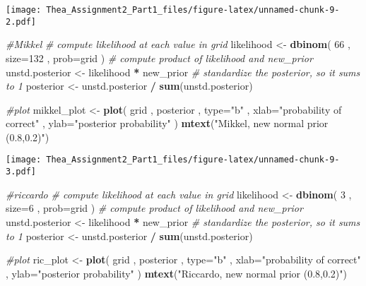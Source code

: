 \documentclass[]{article}
\newenvironment{Shaded}{\begin{snugshade}}{\end{snugshade}}
\newcommand{\KeywordTok}[1]{\textcolor[rgb]{0.13,0.29,0.53}{\textbf{#1}}}
\newcommand{\DataTypeTok}[1]{\textcolor[rgb]{0.13,0.29,0.53}{#1}}
\newcommand{\DecValTok}[1]{\textcolor[rgb]{0.00,0.00,0.81}{#1}}
\newcommand{\StringTok}[1]{\textcolor[rgb]{0.31,0.60,0.02}{#1}}
\newcommand{\CommentTok}[1]{\textcolor[rgb]{0.56,0.35,0.01}{\textit{#1}}}
\newcommand{\OperatorTok}[1]{\textcolor[rgb]{0.81,0.36,0.00}{\textbf{#1}}}
\newcommand{\NormalTok}[1]{#1}
\begin{document}
\texttt{[image: Thea\_Assignment2\_Part1\_files/figure-latex/unnamed-chunk-9-2.pdf]}

\begin{Shaded}
\begin{Highlighting}[]
\CommentTok{#Mikkel}
\CommentTok{# compute likelihood at each value in grid}
\NormalTok{likelihood <-}\StringTok{ }\KeywordTok{dbinom}\NormalTok{( }\DecValTok{66}\NormalTok{ , }\DataTypeTok{size=}\DecValTok{132}\NormalTok{ , }\DataTypeTok{prob=}\NormalTok{grid )}
\CommentTok{# compute product of likelihood and new_prior}
\NormalTok{unstd.posterior <-}\StringTok{ }\NormalTok{likelihood }\OperatorTok{*}\StringTok{ }\NormalTok{new_prior}
\CommentTok{# standardize the posterior, so it sums to 1}
\NormalTok{posterior <-}\StringTok{ }\NormalTok{unstd.posterior }\OperatorTok{/}\StringTok{ }\KeywordTok{sum}\NormalTok{(unstd.posterior)}

\CommentTok{#plot}
\NormalTok{mikkel_plot <-}\StringTok{ }\KeywordTok{plot}\NormalTok{( grid , posterior , }\DataTypeTok{type=}\StringTok{"b"}\NormalTok{ ,}
    \DataTypeTok{xlab=}\StringTok{"probability of correct"}\NormalTok{ , }\DataTypeTok{ylab=}\StringTok{"posterior probability"}\NormalTok{ )}
\KeywordTok{mtext}\NormalTok{(}\StringTok{"Mikkel, new normal prior (0.8,0.2)"}\NormalTok{)}
\end{Highlighting}
\end{Shaded}

\texttt{[image: Thea\_Assignment2\_Part1\_files/figure-latex/unnamed-chunk-9-3.pdf]}

\begin{Shaded}
\begin{Highlighting}[]
\CommentTok{#riccardo}
\CommentTok{# compute likelihood at each value in grid}
\NormalTok{likelihood <-}\StringTok{ }\KeywordTok{dbinom}\NormalTok{( }\DecValTok{3}\NormalTok{ , }\DataTypeTok{size=}\DecValTok{6}\NormalTok{ , }\DataTypeTok{prob=}\NormalTok{grid )}
\CommentTok{# compute product of likelihood and new_prior}
\NormalTok{unstd.posterior <-}\StringTok{ }\NormalTok{likelihood }\OperatorTok{*}\StringTok{ }\NormalTok{new_prior}
\CommentTok{# standardize the posterior, so it sums to 1}
\NormalTok{posterior <-}\StringTok{ }\NormalTok{unstd.posterior }\OperatorTok{/}\StringTok{ }\KeywordTok{sum}\NormalTok{(unstd.posterior)}

\CommentTok{#plot}
\NormalTok{ric_plot <-}\StringTok{ }\KeywordTok{plot}\NormalTok{( grid , posterior , }\DataTypeTok{type=}\StringTok{"b"}\NormalTok{ ,}
    \DataTypeTok{xlab=}\StringTok{"probability of correct"}\NormalTok{ , }\DataTypeTok{ylab=}\StringTok{"posterior probability"}\NormalTok{ )}
\KeywordTok{mtext}\NormalTok{(}\StringTok{"Riccardo, new normal prior (0.8,0.2)"}\NormalTok{)}
\end{Highlighting}
\end{Shaded}
\end{document}

